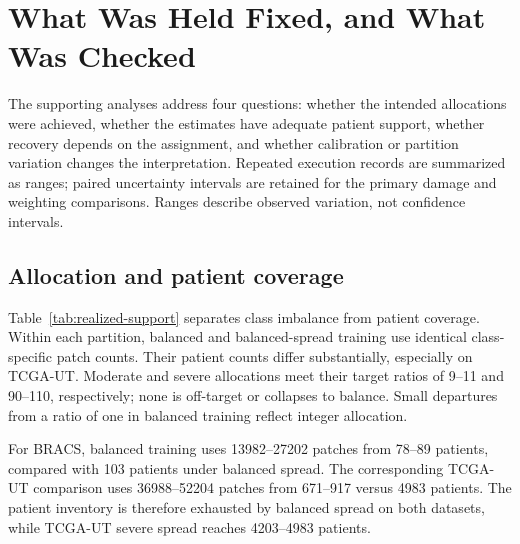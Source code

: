 \section{What Was Held Fixed, and What Was Checked}
\label{app:realized}
The supporting analyses address four questions: whether the intended allocations were achieved, whether the estimates have adequate patient support, whether recovery depends on the assignment, and whether calibration or partition variation changes the interpretation. Repeated execution records are summarized as ranges; paired uncertainty intervals are retained for the primary damage and weighting comparisons. Ranges describe observed variation, not confidence intervals.

\subsection{Allocation and patient coverage}
\label{app:realized-construction}
Table~\ref{tab:realized-support} separates class imbalance from patient coverage. Within each partition, balanced and balanced-spread training use identical class-specific patch counts. Their patient counts differ substantially, especially on TCGA-UT. Moderate and severe allocations meet their target ratios of 9--11 and 90--110, respectively; none is off-target or collapses to balance. Small departures from a ratio of one in balanced training reflect integer allocation.

\begin{table}[H]
\centering\footnotesize\setlength{\tabcolsep}{3pt}

\caption{Allocation ranges across the three partitions and available assignments. Patients are unique contributing patients, not summed class counts. Patch counts refer to one realized training allocation. Spread increases patient coverage at matched patch counts; it does not necessarily reach every eligible patient under severe allocation.}
\label{tab:realized-support}
\end{table}

\noindent For BRACS, balanced training uses \num{13982}--\num{27202} patches from \num{78}--\num{89} patients, compared with \num{103} patients under balanced spread. The corresponding TCGA-UT comparison uses \num{36988}--\num{52204} patches from \num{671}--\num{917} versus \num{4983} patients. The patient inventory is therefore exhausted by balanced spread on both datasets, while TCGA-UT severe spread reaches \num{4203}--\num{4983} patients.

